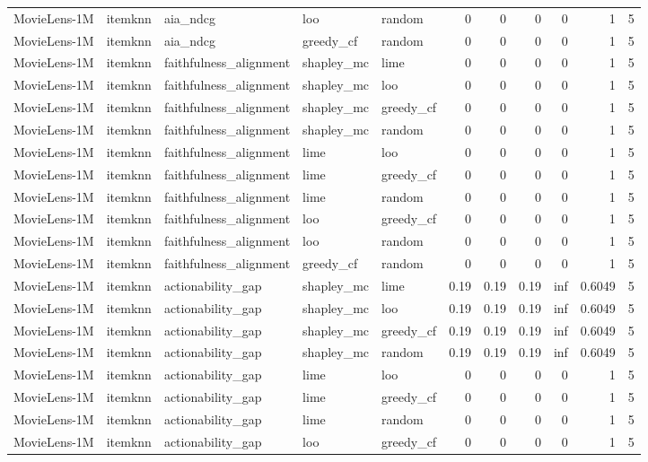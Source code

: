 \begin{table}[t]
{\begin{tabular}{lllllrrrrrr}
MovieLens-1M & itemknn & aia\_ndcg & loo & random & 0 & 0 & 0 & 0 & 1 & 5 \\
MovieLens-1M & itemknn & aia\_ndcg & greedy\_cf & random & 0 & 0 & 0 & 0 & 1 & 5 \\
MovieLens-1M & itemknn & faithfulness\_alignment & shapley\_mc & lime & 0 & 0 & 0 & 0 & 1 & 5 \\
MovieLens-1M & itemknn & faithfulness\_alignment & shapley\_mc & loo & 0 & 0 & 0 & 0 & 1 & 5 \\
MovieLens-1M & itemknn & faithfulness\_alignment & shapley\_mc & greedy\_cf & 0 & 0 & 0 & 0 & 1 & 5 \\
MovieLens-1M & itemknn & faithfulness\_alignment & shapley\_mc & random & 0 & 0 & 0 & 0 & 1 & 5 \\
MovieLens-1M & itemknn & faithfulness\_alignment & lime & loo & 0 & 0 & 0 & 0 & 1 & 5 \\
MovieLens-1M & itemknn & faithfulness\_alignment & lime & greedy\_cf & 0 & 0 & 0 & 0 & 1 & 5 \\
MovieLens-1M & itemknn & faithfulness\_alignment & lime & random & 0 & 0 & 0 & 0 & 1 & 5 \\
MovieLens-1M & itemknn & faithfulness\_alignment & loo & greedy\_cf & 0 & 0 & 0 & 0 & 1 & 5 \\
MovieLens-1M & itemknn & faithfulness\_alignment & loo & random & 0 & 0 & 0 & 0 & 1 & 5 \\
MovieLens-1M & itemknn & faithfulness\_alignment & greedy\_cf & random & 0 & 0 & 0 & 0 & 1 & 5 \\
MovieLens-1M & itemknn & actionability\_gap & shapley\_mc & lime & 0.19 & 0.19 & 0.19 & inf & 0.6049 & 5 \\
MovieLens-1M & itemknn & actionability\_gap & shapley\_mc & loo & 0.19 & 0.19 & 0.19 & inf & 0.6049 & 5 \\
MovieLens-1M & itemknn & actionability\_gap & shapley\_mc & greedy\_cf & 0.19 & 0.19 & 0.19 & inf & 0.6049 & 5 \\
MovieLens-1M & itemknn & actionability\_gap & shapley\_mc & random & 0.19 & 0.19 & 0.19 & inf & 0.6049 & 5 \\
MovieLens-1M & itemknn & actionability\_gap & lime & loo & 0 & 0 & 0 & 0 & 1 & 5 \\
MovieLens-1M & itemknn & actionability\_gap & lime & greedy\_cf & 0 & 0 & 0 & 0 & 1 & 5 \\
MovieLens-1M & itemknn & actionability\_gap & lime & random & 0 & 0 & 0 & 0 & 1 & 5 \\
MovieLens-1M & itemknn & actionability\_gap & loo & greedy\_cf & 0 & 0 & 0 & 0 & 1 & 5 \\

\end{tabular}}
\end{table}
